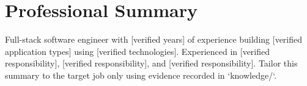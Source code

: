 \section{Professional Summary}
Full-stack software engineer with [verified years] of experience building [verified application types] using [verified technologies]. Experienced in [verified responsibility], [verified responsibility], and [verified responsibility]. Tailor this summary to the target job only using evidence recorded in `knowledge/`.
